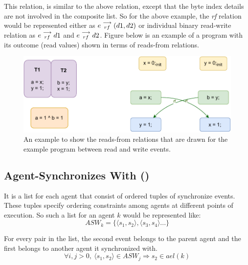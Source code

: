             This relation, is similar to the above relation, except that the byte index details are not involved in the composite list. So for the above example, the \textit{rf} relation would be represented either as   
                $e\stackrel{\longrightarrow}{_{rf}}(d1, d2)$
            or individual binary read-write relation as 
                $e\stackrel{\longrightarrow}{_{rf}}d1$ and $e\stackrel{\longrightarrow}{_{rf}}d2$.
            Figure below is an example of a program with its outcome (read values) shown in terms of reads-from relations. 
            \begin{figure}[H]
                \centering
                \includegraphics[scale=0.7]{4.ECMAScriptMemoryModel/ReadsFrom.pdf}
                \caption{An example to show the reads-from relations that are drawn for the example program between read and write events.}
                \label{read-from}
            \end{figure}
            
        \subsection{Agent-Synchronizes With ()}
        
            It is a list for each agent that consist of ordered tuples of synchronize events. These tuples specify ordering constraints among agents at different points of execution. So such a list for an agent $k$ would be represented like:  
                \[ASW_k = \{ \langle s_1, s_2 \rangle, \langle s_3, s_4 \rangle ...\}\]
        
            For every pair in the list, the second event belongs to the parent agent and the first belongs to another agent it synchronized with\footnotemark.
                \[  
                    \forall{i,j>0},\ 
                    \langle s_1, s_2 \rangle \in ASW_j 
                    \Rightarrow{} 
                    s_2 \in ael(k)                        
                \]

